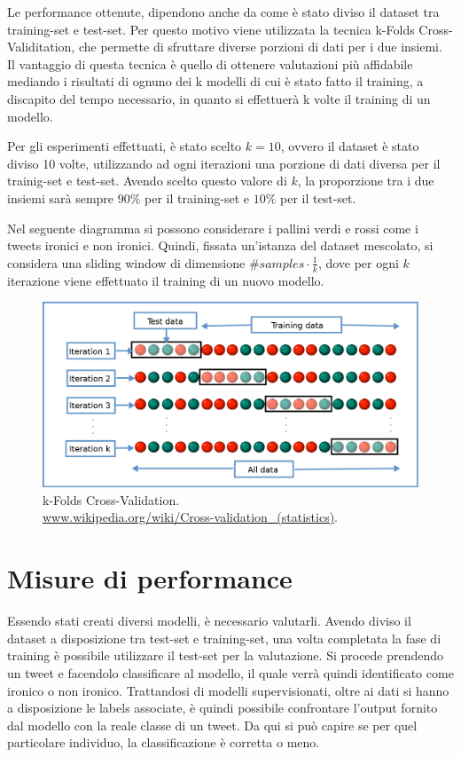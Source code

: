 \documentclass[oneside]{book}
\begin{document}
Le performance ottenute, dipendono anche da come è stato diviso il dataset tra training-set e test-set. Per questo motivo viene utilizzata la tecnica k-Folds Cross-Validitation, che permette di sfruttare diverse porzioni di dati per i due insiemi. Il vantaggio di questa tecnica è quello di ottenere valutazioni più affidabile mediando i risultati di ognuno dei k modelli di cui è stato fatto il training, a discapito del tempo necessario, in quanto si effettuerà k volte il training di un modello.

Per gli esperimenti effettuati, è stato scelto $k=10$, ovvero il dataset è stato diviso 10 volte, utilizzando ad ogni iterazioni una porzione di dati diversa per il trainig-set e test-set. Avendo scelto questo valore di $k$, la proporzione tra i due insiemi sarà sempre $90\%$ per il training-set e $10\%$ per il test-set.

Nel seguente diagramma si possono considerare i pallini verdi e rossi come i tweets ironici e non ironici. Quindi, fissata un'istanza del dataset mescolato, si considera una sliding window di dimensione $\#samples \cdot \frac{1}{k}$, dove per ogni $k$ iterazione viene effettuato il training di un nuovo modello.

\begin{figure}[!h]
	\centering
	\includegraphics[width=13cm]{assets/cross-validation.png}
	\caption{k-Folds Cross-Validation. \\ \url{www.wikipedia.org/wiki/Cross-validation_(statistics)}.}
	\label{fig:cross-validation}
\end{figure}


\section{Misure di performance}
Essendo stati creati diversi modelli, è necessario valutarli. Avendo diviso il dataset a disposizione tra test-set e training-set, una volta completata la fase di training è possibile utilizzare il test-set per la valutazione. Si procede prendendo un tweet e facendolo classificare al modello, il quale verrà quindi identificato come ironico o non ironico. Trattandosi di modelli supervisionati, oltre ai dati si hanno a disposizione le labels associate, è quindi possibile confrontare l'output fornito dal modello con la reale classe di un tweet. Da qui si può capire se per quel particolare individuo, la classificazione è corretta o meno.
\end{document}
